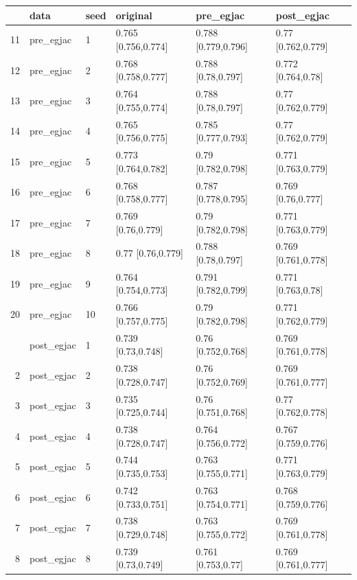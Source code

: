 \documentclass[12pt]{article}
\begin{document}
\begin{table}[ht]
\centering
\begin{tabular}{rlllll}
  \toprule
 & data & seed & original & pre\_egjac & post\_egjac \\ 
  \midrule
  11 & pre\_egjac & 1 & 0.765 [0.756,0.774] & 0.788 [0.779,0.796] & 0.77 [0.762,0.779] \\ 
  12 & pre\_egjac & 2 & 0.768 [0.758,0.777] & 0.788 [0.78,0.797] & 0.772 [0.764,0.78] \\ 
  13 & pre\_egjac & 3 & 0.764 [0.755,0.774] & 0.788 [0.78,0.797] & 0.77 [0.762,0.779] \\ 
  14 & pre\_egjac & 4 & 0.765 [0.756,0.775] & 0.785 [0.777,0.793] & 0.77 [0.762,0.779] \\ 
  15 & pre\_egjac & 5 & 0.773 [0.764,0.782] & 0.79 [0.782,0.798] & 0.771 [0.763,0.779] \\ 
  16 & pre\_egjac & 6 & 0.768 [0.758,0.777] & 0.787 [0.778,0.795] & 0.769 [0.76,0.777] \\ 
  17 & pre\_egjac & 7 & 0.769 [0.76,0.779] & 0.79 [0.782,0.798] & 0.771 [0.763,0.779] \\ 
  18 & pre\_egjac & 8 & 0.77 [0.76,0.779] & 0.788 [0.78,0.797] & 0.769 [0.761,0.778] \\ 
  19 & pre\_egjac & 9 & 0.764 [0.754,0.773] & 0.791 [0.782,0.799] & 0.771 [0.763,0.78] \\ 
  20 & pre\_egjac & 10 & 0.766 [0.757,0.775] & 0.79 [0.782,0.798] & 0.771 [0.762,0.779] \\  \addlinespace
1 & post\_egjac & 1 & 0.739 [0.73,0.748] & 0.76 [0.752,0.768] & 0.769 [0.761,0.778] \\ 
  2 & post\_egjac & 2 & 0.738 [0.728,0.747] & 0.76 [0.752,0.769] & 0.769 [0.761,0.777] \\ 
  3 & post\_egjac & 3 & 0.735 [0.725,0.744] & 0.76 [0.751,0.768] & 0.77 [0.762,0.778] \\ 
  4 & post\_egjac & 4 & 0.738 [0.728,0.747] & 0.764 [0.756,0.772] & 0.767 [0.759,0.776] \\ 
  5 & post\_egjac & 5 & 0.744 [0.735,0.753] & 0.763 [0.755,0.771] & 0.771 [0.763,0.779] \\ 
  6 & post\_egjac & 6 & 0.742 [0.733,0.751] & 0.763 [0.754,0.771] & 0.768 [0.759,0.776] \\ 
  7 & post\_egjac & 7 & 0.738 [0.729,0.748] & 0.763 [0.755,0.772] & 0.769 [0.761,0.778] \\ 
  8 & post\_egjac & 8 & 0.739 [0.73,0.749] & 0.761 [0.753,0.77] & 0.769 [0.761,0.777] \\ 

\end{tabular}
\end{table}
\end{document}
